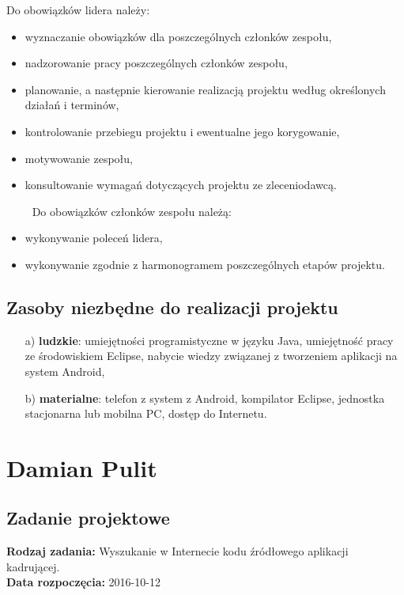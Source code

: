 Do obowiązków lidera należy:
\begin{itemize} \itemsep1pt \parskip0pt 
\item wyznaczanie obowiązków dla poszczególnych członków zespołu,
\item nadzorowanie pracy poszczególnych członków zespołu,
\item planowanie, a następnie kierowanie realizacją projektu według określonych działań i terminów, 
\item kontrolowanie przebiegu projektu i ewentualne jego korygowanie,
\item motywowanie zespołu,
\item konsultowanie wymagań dotyczących projektu ze zleceniodawcą.
\end{itemize}
$\qquad$ Do obowiązków członków zespołu należą:
\begin{itemize}\itemsep1pt \parskip0pt 
\item wykonywanie poleceń lidera,
\item wykonywanie zgodnie z harmonogramem poszczególnych etapów projektu.
\end{itemize}
\section{Zasoby niezbędne do realizacji projektu}
\begin{itemize}
\item [a)] \textbf{ludzkie}: umiejętności programistyczne w języku Java, umiejętność pracy ze środowiskiem Eclipse, nabycie wiedzy związanej z tworzeniem aplikacji na system Android,
\item [b)] \textbf{materialne}: telefon z system z Android, kompilator Eclipse, jednostka stacjonarna lub mobilna PC, dostęp do Internetu.
\end{itemize}


\chapter {Damian Pulit}
\section{Zadanie projektowe}
\noindent\textbf{Rodzaj zadania:}  Wyszukanie w Internecie kodu źródłowego aplikacji kadrującej.\\

\noindent\textbf{Data rozpoczęcia:} 2016-10-12\\

